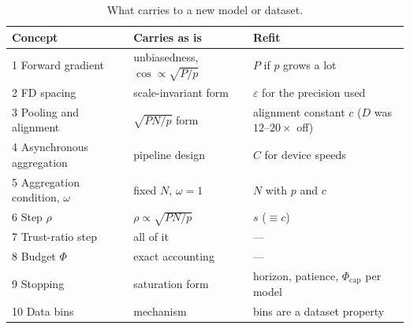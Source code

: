 \begin{table}[t]
\centering
\caption{What carries to a new model or dataset.}
\small
\begin{tabular}{@{}lll@{}}
\toprule
Concept & Carries as is & Refit \\
\midrule
1 Forward gradient & unbiasedness, $\cos\propto\sqrt{P/p}$ & $P$ if $p$ grows a lot \\
2 FD spacing & scale-invariant form & $\varepsilon$ for the precision used \\
3 Pooling and alignment & $\sqrt{PN/p}$ form & alignment constant $c$ ($D$ was $12$--$20\times$ off) \\
4 Asynchronous aggregation & pipeline design & $C$ for device speeds \\
5 Aggregation condition, $\omega$ & fixed $N$, $\omega=1$ & $N$ with $p$ and $c$ \\
6 Step $\rho$ & $\rho\propto\sqrt{PN/p}$ & $s$ ($\equiv c$) \\
7 Trust-ratio step & all of it & --- \\
8 Budget $\Phi$ & exact accounting & --- \\
9 Stopping & saturation form & horizon, patience, $\Phi_{\mathrm{cap}}$ per model \\
10 Data bins & mechanism & bins are a dataset property \\
\bottomrule
\end{tabular}
\end{table}
